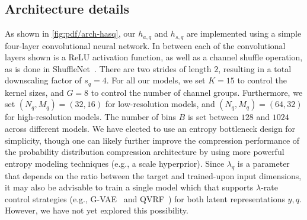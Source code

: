 \subsection{Architecture details}
\label{sec:pdf_compression/experimental_setup/architecture_details}

As shown in \cref{fig:pdf/arch-hasq}, our $h_{a,q}$ and $h_{s,q}$ are implemented using a simple four-layer convolutional neural network.
In between each of the convolutional layers shown is a ReLU activation function, as well as a channel shuffle operation, as is done in ShuffleNet~\cite{zhang2017shufflenet}.
There are two strides of length $2$, resulting in a total downscaling factor of $s_q = 4$.
For all our models, we set $K = 15$ to control the kernel sizes, and $G = 8$ to control the number of channel groups.
Furthermore, we set $(N_q, M_q) = (32, 16)$ for low-resolution models, and $(N_q, M_q) = (64, 32)$ for high-resolution models.
The number of bins $B$ is set between $128$ and $1024$ across different models.
We have elected to use an entropy bottleneck design for simplicity, though one can likely further improve the compression performance of the probability distribution compression architecture by using more powerful entropy modeling techniques (e.g., a scale hyperprior).
Since $\lambda_q$ is a parameter that depends on the ratio between the target and trained-upon input dimensions, it may also be advisable to train a single model which that supports $\lambda$-rate control strategies (e.g., G-VAE~\cite{cui2020gvae,cui2022asymmetric} and QVRF~\cite{tong2023qvrf}) for both latent representations $y, q$.
However, we have not yet explored this possibility.
%


